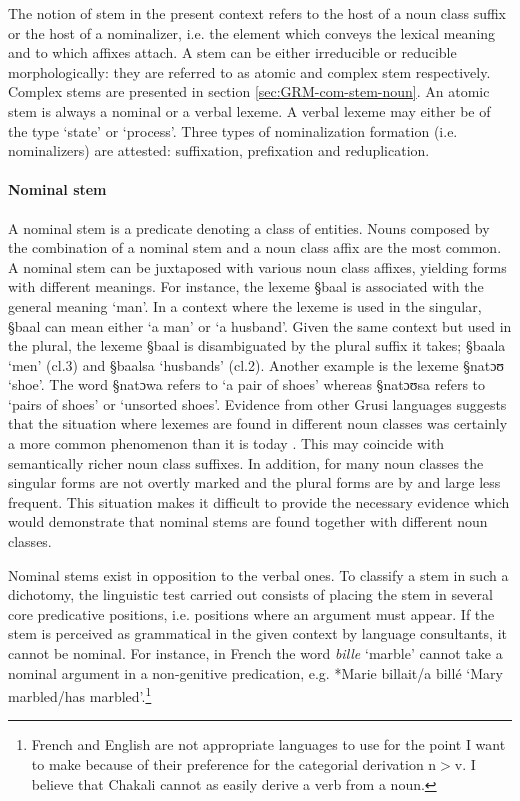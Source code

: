 The notion of stem in the present context refers to the host of a noun class
suffix or the  host of a nominalizer, i.e. the element which conveys the lexical
meaning and  to which affixes attach. A stem can be either irreducible or
reducible morphologically: they are referred to as atomic  and complex stem
respectively.  Complex stems are presented in  section
\ref{sec:GRM-com-stem-noun}.   An atomic stem is always a  nominal or a verbal
lexeme.  A verbal lexeme may either be of the type `state' or `process'. Three
types of nominalization formation (i.e. nominalizers) are attested: suffixation,
prefixation and reduplication.  


\paragraph{Nominal  stem}
\label{sec:GRM-nom-stem}
A nominal stem is a predicate denoting a class of entities.   Nouns composed by
the combination of  a nominal stem and a noun class affix are the most common. A
nominal stem can be juxtaposed with various noun class affixes, yielding forms
with
different meanings. For instance, the lexeme {\S baal} is associated with the
general meaning `man'. In a context where the lexeme is used in the singular,
{\S baal} can mean either `a man' or `a husband'. Given the same context but
used in the plural, the lexeme {\S baal} is disambiguated by the 
plural suffix it takes;  {\S baala} `men'  ({\sc cl.3}) and  {\S baalsa}
`husbands'  ({\sc cl.2}). Another
example is the lexeme {\S natɔʊ} `shoe'. The word {\S natɔwa} refers to `a pair
of shoes' whereas {\S natɔʊsa} refers to `pairs of shoes' or `unsorted shoes'.
Evidence from other Grusi languages suggests that the situation where    lexemes
are found in different noun classes was certainly a   more common
phenomenon than it is today \cite[126-128]{Bonv88}. This may coincide
with semantically richer
noun class suffixes. In addition, for many noun classes the singular forms are
not overtly marked and the plural forms are by and large less frequent. This
situation makes it difficult to provide the necessary evidence which would
demonstrate that nominal stems are found together with different noun classes.  

Nominal stems exist in opposition to the verbal ones. To classify a stem in such
a dichotomy, the linguistic test carried out consists of placing the stem in
several core predicative positions, i.e. positions where an
argument must appear. If the stem is perceived as grammatical in the given
context by 
language consultants, it cannot be nominal. For instance, in French the word
{\it bille}  `marble' cannot take a nominal argument in a non-genitive
predication, e.g. *Marie billait/a billé  `Mary marbled/has
marbled'.\footnote{\label{ft:GRM-fre-eng-deri}French and English are not 
appropriate languages to use
for the point I want to make  because of their preference  for the categorial
derivation n$>$v. I believe that
Chakali cannot as easily derive a verb from a noun.}


